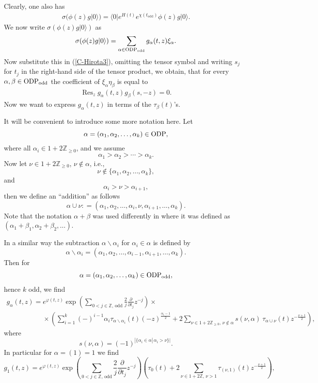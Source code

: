 \documentclass[pdftex]{sigma}
\numberwithin{equation}{section}
\newcommand{\Res}{\mathop\mathrm{Res}\nolimits}
\begin{document}
Clearly, one also has
\begin{gather}
\label{sphi} \sigma(\phi(z)g|0\rangle)=\langle
0|e^{H(t)}e^{\chi(t_\mathrm{odd})}\phi(z)g|0\rangle .
\end{gather}
We now write $\sigma(\phi(z)g|0\rangle)$ as
\[
\sigma(\phi(z)g|0\rangle)=\sum_{\alpha \in {\rm
ODP}_\mathrm{odd}}g_\alpha(t,z)\xi_\alpha .
\]
Now substitute this in (\ref{C-Hirota3}), omitting the tensor
symbol and writing $s_j$  for $t_j$ in the right-hand side of the tensor product, we obtain,
that for every $\alpha,\beta\in{\rm ODP}_\mathrm{odd}$ the coef\/f\/icient of
$\xi_\alpha\eta_\beta$ is equal to
\begin{gather}
\label{HHir} \Res_zg_\alpha(t,z)g_\beta(s,-z)=0 .
\end{gather}
Now we want to express $g_\alpha(t,z)$ in terms of the
$\tau_\beta(t)$'s.

It will be convenient to introduce some more notation here. Let
\[
\alpha=(\alpha_1,\alpha_2,\ldots,\alpha_{k})\in \rm ODP,
\]
where all $\alpha_i\in 1+2\mathbb{Z}_{\ge0}$, and we assume
\[
\alpha_1>\alpha_2>\cdots>\alpha_{k}.
\]
Now let $\nu\in 1+2\mathbb{Z}_{\ge0}$, $\nu\not\in \alpha$, i.e.,
\[
\nu\not\in\{\alpha_1,\alpha_2,\ldots,\alpha_{k}\},
\]
and
\[
\alpha_i>\nu>\alpha_{i+1} ,
\]
then we def\/ine an ``addition'' as follows
\[
\alpha \cup \nu : =(\alpha_1,\alpha_2,\ldots, \alpha_i, \nu,
\alpha_{i+1},\ldots,\alpha_{k}) .
\]
Note that the notation $\alpha+\beta$ was used dif\/ferently
in \cite{Mac} where it was def\/ined as
$(\alpha_1+\beta_1,\alpha_2+\beta_2,\dots)$.

In a similar way the subtraction $\alpha \backslash \alpha_i$
for $ \alpha_i\in\alpha$ is def\/ined by
\[
\alpha \backslash \alpha_i=(\alpha_1,\alpha_2,\ldots,
\alpha_{i-1}, \alpha_{i+1},\ldots,\alpha_{k}) .
\]
Then for
\[
\alpha=(\alpha_1,\alpha_2,\ldots,\alpha_{k})\in {\rm ODP}_\mathrm{odd} ,
\]
hence $k$ odd, we f\/ind
\begin{gather}
g_\alpha(t,z) =e^{\varphi(t,z)}
\exp\left(\sum_{0<j\in\mathbb{Z},\,\mathrm{odd}}
\frac{2}{j}\frac{\partial}{\partial t_j}z^{-j}\right)\times{}\nonumber\\
\phantom{g_\alpha(t,z) =}{}  \times \left(\sum_{i=1}^{k} (-)^{i-1}
\alpha_i\tau_{\alpha\backslash \alpha_i}(t)(-z)^{\frac{\alpha_i
-1}{2}} + 2\!\sum_{\nu\in 1+ 2\mathbb{Z}_{\ge0},\, \nu\not\in \alpha}\!
s(\nu,\alpha)\ \tau_{\alpha\cup \nu}(t)z^{-\frac{\nu
+1}{2}}\right) ,\!\!\label{Wave}
\end{gather}
where
\[
s(\nu,\alpha)=(-1)^{|\{ \alpha_i\in \alpha|\, \alpha_i>\nu\} |} .
\]
In particular for $\alpha=(1)=1$ we f\/ind
\[
g_{1}(t,z)= e^{\varphi(t,z)}
\exp\left(\sum_{0<j\in\mathbb{Z},\,\mathrm{odd}}
\frac{2}{j}\frac{\partial}{\partial
t_j}z^{-j}\right)\left(\tau_0(t) +2 \sum_{\nu\in 1+
2\mathbb{Z},\, \nu>1} \tau_{(\nu,1)}(t)z^{-\frac{\nu +1}{2}}\right) ,
\]
\end{document}
